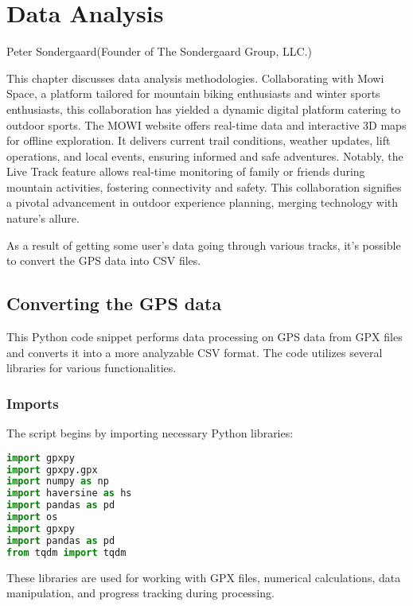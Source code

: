 %
\chapter{Data Analysis}
\label{sec:data}

{Peter Sondergaard}{(Founder of The Sondergaard Group, LLC.)}


This chapter discusses data analysis methodologies. Collaborating with Mowi Space, a platform tailored for mountain biking enthusiasts and winter sports enthusiasts, this collaboration has yielded a dynamic digital platform catering to outdoor sports. The MOWI website offers real-time data and interactive 3D maps for offline exploration. It delivers current trail conditions, weather updates, lift operations, and local events, ensuring informed and safe adventures. Notably, the Live Track feature allows real-time monitoring of family or friends during mountain activities, fostering connectivity and safety. This collaboration signifies a pivotal advancement in outdoor experience planning, merging technology with nature's allure.

As a result of getting some user's data going through various tracks,
it's possible to convert the GPS data into CSV files.


\section{Converting the GPS data}
\label{sec:data-gps}

This Python code snippet performs data processing on GPS data from GPX files and converts it into 
a more analyzable CSV format. The code utilizes several libraries for various functionalities.

\subsection{Imports}

The script begins by importing necessary Python libraries:

\begin{lstlisting}[language=Python]
import gpxpy
import gpxpy.gpx
import numpy as np
import haversine as hs
import pandas as pd
import os
import gpxpy
import pandas as pd
from tqdm import tqdm
\end{lstlisting}

These libraries are used for working with GPX files, numerical calculations, data manipulation, and progress tracking during processing.

